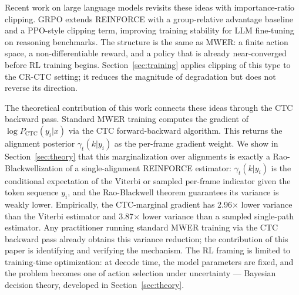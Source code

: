 Recent work on large language models revisits these ideas with importance-ratio clipping. GRPO \cite{shao2024grpo} extends REINFORCE with a group-relative advantage baseline and a PPO-style clipping term, improving training stability for LLM fine-tuning on reasoning benchmarks. The structure is the same as MWER: a finite action space, a non-differentiable reward, and a policy that is already near-converged before RL training begins. Section~\ref{sec:training} applies clipping of this type to the CR-CTC setting; it reduces the magnitude of degradation but does not reverse its direction.

The theoretical contribution of this work connects these ideas through the CTC backward pass. Standard MWER training computes the gradient of $\log P_\text{CTC}(y_i|x)$ via the CTC forward-backward algorithm. This returns the alignment posterior $\gamma_t(k|y_i)$ as the per-frame gradient weight. We show in Section~\ref{sec:theory} that this marginalization over alignments is exactly a Rao-Blackwellization of a single-alignment REINFORCE estimator: $\gamma_t(k|y_i)$ is the conditional expectation of the Viterbi or sampled per-frame indicator given the token sequence $y_i$, and the Rao-Blackwell theorem guarantees its variance is weakly lower. Empirically, the CTC-marginal gradient has 2.96$\times$ lower variance than the Viterbi estimator and 3.87$\times$ lower variance than a sampled single-path estimator. Any practitioner running standard MWER training via the CTC backward pass already obtains this variance reduction; the contribution of this paper is identifying and verifying the mechanism. The RL framing is limited to training-time optimization: at decode time, the model parameters are fixed, and the problem becomes one of action selection under uncertainty — Bayesian decision theory, developed in Section~\ref{sec:theory}.




